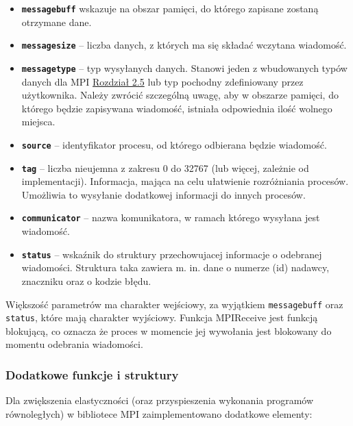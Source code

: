 \begin{itemize}
	\item \texttt{\textbf{message\textunderscore buff}} wskazuje na obszar pamięci, do którego zapisane zostaną otrzymane dane.
	\item \texttt{\textbf{message\textunderscore size}} -- liczba danych, z których ma się składać wczytana wiadomość.
	\item \texttt{\textbf{message\textunderscore type}} -- typ wysyłanych danych. Stanowi jeden z wbudowanych typów danych dla MPI \hyperref[table:datatypes]{Rozdział 2.5} lub typ pochodny zdefiniowany przez użytkownika. Należy zwrócić szczególną uwagę, aby w obszarze pamięci, do którego będzie zapisywana wiadomość, istniała odpowiednia ilość wolnego miejsca.
	\item \texttt{\textbf{source}} -- identyfikator procesu, od którego odbierana będzie wiadomość.
	\item \texttt{\textbf{tag}} -- liczba nieujemna z zakresu 0 do 32767 (lub więcej, zależnie od implementacji). Informacja, mająca na celu ułatwienie rozróżniania procesów. Umożliwia to wysyłanie dodatkowej informacji do innych procesów.
	\item \texttt{\textbf{communicator}} -- nazwa komunikatora, w ramach którego wysyłana jest wiadomość.
	\item \texttt{\textbf{status}} -- wskaźnik do struktury przechowujacej informacje o odebranej wiadomości. Struktura taka zawiera m. in. dane o numerze (id) nadawcy, znaczniku oraz o kodzie błędu.
\end{itemize}

Większość parametrów ma charakter wejściowy, za wyjątkiem \texttt{message\textunderscore buff} oraz \texttt{status}, które mają charakter wyjściowy. Funkcja MPI\textunderscore Receive jest funkcją blokującą, co oznacza że proces w momencie jej wywołania jest blokowany do momentu odebrania wiadomości.

\subsubsection{Dodatkowe funkcje i struktury}

Dla zwiększenia elastyczności (oraz przyspieszenia wykonania programów równoległych) w bibliotece MPI zaimplementowano dodatkowe elementy:

